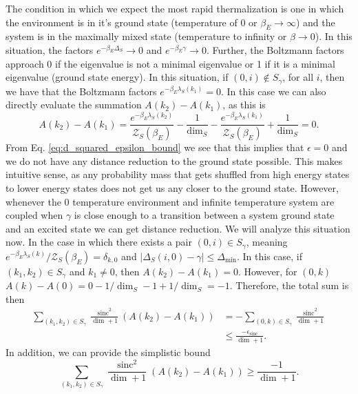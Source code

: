 \documentclass{article}
\newcommand{\partfun}{\mathcal{Z}}
\DeclareMathOperator{\sinc}{sinc}
\begin{document}
    The condition in which we expect the most rapid thermalization is one in which the environment is in it's ground state (temperature of 0 or $\beta_E \to \infty$) and the system is in the maximally mixed state (temperature to infinity or $\beta \to 0$). In this situation, the factors $e^{-\beta_E \Delta_S} \to 0$ and $e^{-\beta_E \gamma} \to 0$. Further, the Boltzmann factors approach 0 if the eigenvalue is not a minimal eigenvalue or 1 if it is a minimal eigenvalue (ground state energy). In this situation, if $(0, i) \notin S_{\gamma}$, for all $i$, then we have that the Boltzmann factors $e^{-\beta_E \lambda_S(k_1)} = 0$. In this case we can also directly evaluate the summation $A(k_2) - A(k_1)$, as this is 
    \begin{equation}
        A(k_2) - A(k_1) = \frac{e^{-\beta_E \lambda_S(k_2)}}{\partfun_S(\beta_E)} - \frac{1}{\dim_S} - \frac{e^{-\beta_E \lambda_S(k_1)}}{\partfun_S(\beta_E)} + \frac{1}{\dim_S} = 0.
    \end{equation}
    From Eq. \eqref{eq:d_squared_epsilon_bound} we see that this implies that $\epsilon = 0$ and we do not have any distance reduction to the ground state possible. This makes intuitive sense, as any probability mass that gets shuffled from high energy states to lower energy states does not get us any closer to the ground state. 
    However, whenever the 0 temperature environment and infinite temperature system are coupled when $\gamma$ is close enough to a transition between a system ground state and an excited state we can get distance reduction. We will analyze this situation now. In the case in which there exists a pair $(0, i) \in S_{\gamma}$, meaning $e^{-\beta_E \lambda_S(k)} / \partfun_S(\beta_E) = \delta_{k,0}$ and $|\Delta_S(i, 0) - \gamma| \leq \Delta_{\min}$. In this case, if $(k_1, k_2) \in S_{\gamma}$ and $k_1 \neq 0$, then $A(k_2) - A(k_1) = 0$. However, for $(0, k)$ $A(k) - A(0) = 0 - 1/\dim_S - 1 + 1/\dim_S = -1$. Therefore, the total sum is then 
    \begin{align}
        \sum_{(k_1, k_2) \in S_{\gamma}} \frac{\sinc^2}{\dim + 1} (A(k_2) - A(k_1)) &= - \sum_{(0, k) \in S_{\gamma}} \frac{\sinc^2}{\dim + 1} \\
        &\leq \frac{- \epsilon_{\sinc}}{\dim + 1}.
    \end{align}
    In addition, we can provide the simplistic bound 
    \begin{equation}
        \sum_{(k_1, k_2) \in S_{\gamma}} \frac{\sinc^2}{\dim + 1}(A(k_2) - A(k_1)) \geq \frac{-1}{\dim + 1}.
    \end{equation}
\end{document}
